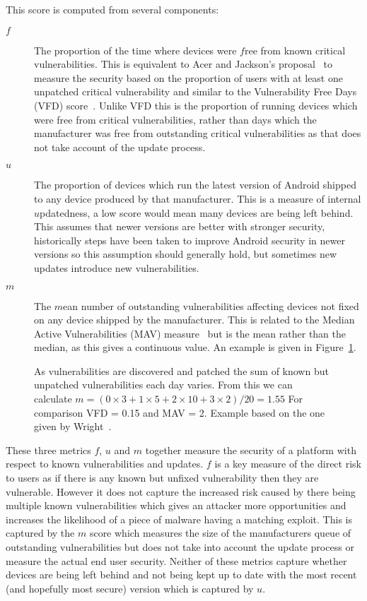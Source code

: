 This score is computed from several components:
\begin{description}
  \item[$f$] The proportion of the time where devices were $f$ree from known critical vulnerabilities. This is equivalent to Acer and Jackson's proposal~\cite{Acer2010} to measure the security based on the proportion of users with at least one unpatched critical vulnerability and similar to the Vulnerability Free Days (VFD) score~\cite{Wright2014}.
  Unlike VFD this is the proportion of running devices which were free from critical vulnerabilities, rather than days which the manufacturer was free from outstanding critical vulnerabilities as that does not take account of the update process.
  \item[$u$] The proportion of devices which run the latest version of Android shipped to any device produced by that manufacturer. This is a measure of internal $u$pdatedness, a low score would mean many devices are being left behind.
  This assumes that newer versions are better with stronger security, historically steps have been taken to improve Android security in newer versions so this assumption should generally hold, but sometimes new updates introduce new vulnerabilities.
  \item[$m$] The $m$ean number of outstanding vulnerabilities affecting devices not fixed on any device shipped by the manufacturer. This is related to the Median Active Vulnerabilities (MAV) measure~\cite{Wright2014} but is the mean rather than the median, as this gives a continuous value.
  An example is given in Figure~\ref{fig:mcalculation}.
\end{description}

\begin{figure}
\centering

\caption{As vulnerabilities are discovered and patched the sum of known but unpatched vulnerabilities each day varies. From this we can calculate $m = (0 \times 3 + 1 \times 5 + 2 \times 10 + 3 \times 2) / 20 = 1.55$ For comparison VFD = 0.15 and MAV = 2. Example based on the one given by Wright~\cite{Wright2014}.}
\label{fig:mcalculation}
\end{figure}

These three metrics $f$, $u$ and $m$ together measure the security of a platform with respect to known vulnerabilities and updates.
$f$ is a key measure of the direct risk to users as if there is any known but unfixed vulnerability then they are vulnerable.
However it does not capture the increased risk caused by there being multiple known vulnerabilities which gives an attacker more opportunities and increases the likelihood of a piece of malware having a matching exploit.
This is captured by the $m$ score which measures the size of the manufacturers queue of outstanding vulnerabilities but does not take into account the update process or measure the actual end user security.
Neither of these metrics capture whether devices are being left behind and not being kept up to date with the most recent (and hopefully most secure) version which is captured by $u$.

